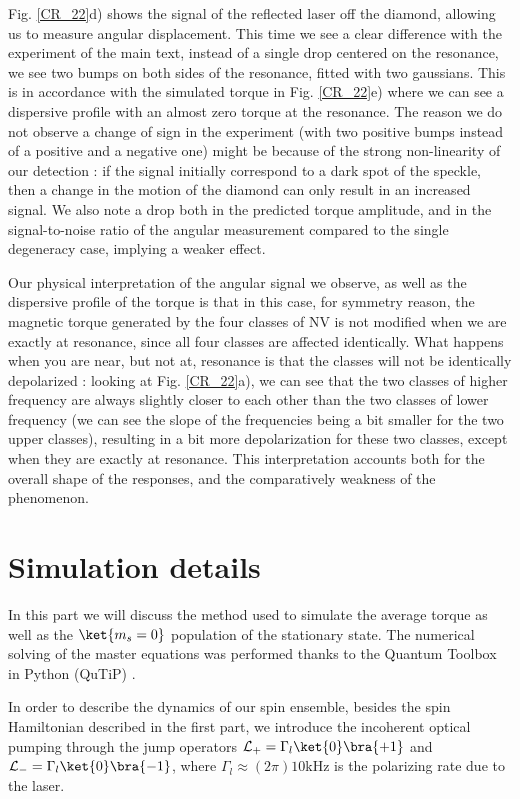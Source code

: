 \documentclass[preprintnumbers,amsmath,amssymb,onecolumn,12pt]{revtex4}
\begin{document}
Fig. \ref{CR_22}d) shows the signal of the reflected laser off the diamond, allowing us to measure angular displacement. This time we see a clear difference with the experiment of the main text, instead of a single drop centered on the resonance, we see two bumps on both sides of the resonance, fitted with two gaussians.
This is in accordance with the simulated torque in Fig. \ref{CR_22}e) where we can see a dispersive profile with an almost zero torque at the resonance. The reason we do not observe a change of sign in the experiment (with two positive bumps instead of a positive and a negative one) might be because of the strong non-linearity of our detection : if the signal initially correspond to a dark spot of the speckle, then a change in the motion of the diamond can only result in an increased signal. We also note a drop both in the predicted torque amplitude, and in the signal-to-noise ratio  of the angular measurement compared to the single degeneracy case, implying a weaker effect.

Our physical interpretation of the angular signal we observe, as well as the dispersive profile of the torque is that in this case, for symmetry reason, the magnetic torque generated by the four classes of NV is not modified when we are exactly at resonance, since all four classes are affected identically. What happens when you are near, but not at, resonance is that the classes will not be identically depolarized : looking at Fig. \ref{CR_22}a), we can see that the two classes of higher frequency are always slightly closer to each other than the two classes of lower frequency (we can see the slope of the frequencies being a bit smaller for the two upper classes), resulting in a bit more depolarization for these two classes, except when they are exactly at resonance. This interpretation accounts both for the overall shape of the responses, and the comparatively weakness of the phenomenon.


\section{Simulation details}
In this part we will discuss the method used to simulate the average torque as well as the $\ket{m_s=0}$ population of the stationary state. The numerical solving of the master equations was performed thanks to the Quantum Toolbox in Python (QuTiP) \citep{qutip1} \citep{qutip2}.

In order to describe the dynamics of our spin ensemble, besides the spin Hamiltonian described in the first part, we introduce the incoherent optical pumping through the jump operators $\mathcal{L}_+ = \Gamma_l \ket{0}\bra{+1} $ and $\mathcal{L}_- = \Gamma_l \ket{0}\bra{-1} $, where $\Gamma_l \approx (2\pi) 10$kHz is the polarizing rate due to the laser.
\end{document}
